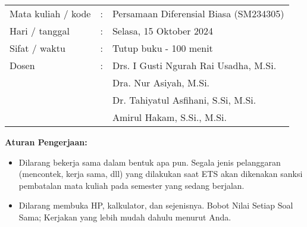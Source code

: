 \documentclass[10pt,openany,a4paper]{article}
\begin{document}
\begin{table}[h!]
  \begin{tabular}{l l l}
    Mata kuliah / kode & : & Persamaan Diferensial Biasa (SM234305) \\
    Hari / tanggal     & : & Selasa, 15 Oktober 2024                \\
    Sifat / waktu      & : & Tutup buku - 100 menit                 \\
    Dosen              & : & Drs. I Gusti Ngurah Rai Usadha, M.Si.  \\
                       &   & Dra. Nur Asiyah, M.Si.                 \\
                       &   & Dr. Tahiyatul Asfihani, S.Si, M.Si.    \\
                       &   & Amirul Hakam, S.Si., M.Si.
  \end{tabular}
\end{table}
\begin{center}
  \textbf{Aturan Pengerjaan:}
\end{center}
\begin{itemize}
  \item Dilarang bekerja sama dalam bentuk apa pun. Segala jenis pelanggaran (mencontek, kerja sama, dll) yang dilakukan saat ETS akan dikenakan sanksi pembatalan mata kuliah pada semester yang sedang berjalan.
  \item Dilarang membuka HP, kalkulator, dan sejenisnya. Bobot Nilai Setiap Soal Sama; Kerjakan yang lebih mudah dahulu menurut Anda.\\
\end{itemize}
\end{document}
